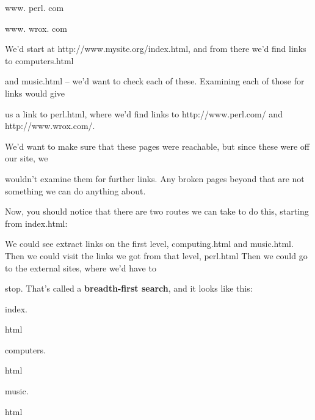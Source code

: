 \documentclass[a4paper,11pt]{book}
\begin{document}
\noindent www. perl. com

\noindent 

\noindent 

\noindent 

\noindent www. wrox. com

\noindent 

\noindent 

\noindent 

\noindent We'd start  at http://www.mysite.org/index.html,  and  from  there  we'd  find links  to  computers.html

\noindent and music.html -- we'd want  to  check  each  of these.  Examining  each  of  those  for links  would  give

\noindent us a  link to  perl.html, where  we'd  find  links  to  http://www.perl.com/ and  http://www.wrox.com/.

\noindent We'd want to  make  sure that  these  pages  were  reachable,  but  since  these  were  off our site,  we

\noindent wouldn't  examine them for further  links.  Any  broken  pages  beyond  that  are not  something  we  can do anything about.

\noindent 

\noindent Now, you should notice that there are two routes we can take to do this, starting from index.html:

\noindent We could see extract links on the first level, computing.html and music.html. Then we could visit the links we got from that level, perl.html Then we could go to the external sites, where we'd have to

\noindent stop. That's called a \textbf{breadth-first search}, and it looks like this:

\noindent 

\noindent 

\noindent 

\noindent index.

\noindent html

\noindent 

\noindent 

\noindent 

\noindent 

\noindent computers.

\noindent html

\noindent music.

\noindent html

\noindent 

\noindent 
\end{document}
